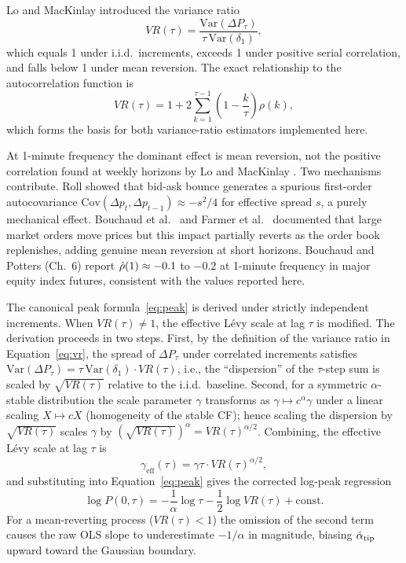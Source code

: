 \documentclass[12pt,a4paper]{article}
\begin{document}
Lo and MacKinlay \cite{LoMacKinlay1988} introduced the variance ratio
\begin{equation}
  VR(\tau) = \frac{\mathrm{Var}(\Delta P_\tau)}{\tau\,\mathrm{Var}(\delta_1)},
  \label{eq:vr}
\end{equation}
which equals 1 under i.i.d.\ increments, exceeds 1 under positive serial
correlation, and falls below 1 under mean reversion. The exact relationship
to the autocorrelation function is
\begin{equation}
  VR(\tau)
  = 1 + 2\sum_{k=1}^{\tau-1}\!\left(1-\frac{k}{\tau}\right)\rho(k),
  \label{eq:vr_rho}
\end{equation}
which forms the basis for both variance-ratio estimators implemented here.

At 1-minute frequency the dominant effect is mean reversion, not the positive
correlation found at weekly horizons by Lo and MacKinlay \cite{LoMacKinlay1988}. Two
mechanisms contribute. Roll \cite{Roll1984} showed that bid-ask bounce
generates a spurious first-order autocovariance $\mathrm{Cov}(\Delta p_t,\Delta p_{t-1})\approx -s^2/4$ for effective spread $s$, a purely mechanical effect. Bouchaud et al.\ \cite{Bouchaud2004} and
Farmer et al.\ \cite{Farmer2006} documented that large market orders move prices but
this impact partially reverts as the order book replenishes, adding genuine
mean reversion at short horizons. Bouchaud and Potters \cite{BouchaudPotters2003} (Ch.~6)
report $\hat{\rho}(1)\approx -0.1$ to $-0.2$ at 1-minute frequency in major
equity index futures, consistent with the values reported here.

The canonical peak formula~\eqref{eq:peak} is derived under strictly
independent increments. When $VR(\tau)\neq 1$, the effective Lévy scale at
lag $\tau$ is modified. The derivation proceeds in two steps.
First, by the definition of the variance ratio in Equation~\eqref{eq:vr},
the spread of $\Delta P_\tau$ under correlated increments satisfies
$\mathrm{Var}(\Delta P_\tau)=\tau\,\mathrm{Var}(\delta_1)\cdot VR(\tau)$,
i.e., the ``dispersion'' of the $\tau$-step sum is scaled by $\sqrt{VR(\tau)}$
relative to the i.i.d.\ baseline.
Second, for a symmetric $\alpha$-stable distribution the scale parameter
$\gamma$ transforms as $\gamma\mapsto c^\alpha\gamma$ under a linear scaling
$X\mapsto cX$ (homogeneity of the stable CF); hence scaling the dispersion
by $\sqrt{VR(\tau)}$ scales $\gamma$ by $(\sqrt{VR(\tau)})^\alpha
= VR(\tau)^{\alpha/2}$.
Combining, the effective Lévy scale at lag $\tau$ is
\begin{equation}
  \gamma_{\mathrm{eff}}(\tau) = \gamma\tau\cdot VR(\tau)^{\alpha/2},
  \label{eq:gamma_eff}
\end{equation}
and substituting into Equation~\eqref{eq:peak} gives the corrected
log-peak regression
\begin{equation}
  \log P(0,\tau)
  = -\frac{1}{\alpha}\log\tau
    - \frac{1}{2}\log VR(\tau)
    + \mathrm{const}.
  \label{eq:corrected_peak}
\end{equation}
For a mean-reverting process ($VR(\tau)<1$) the omission of the second term
causes the raw OLS slope to underestimate $-1/\alpha$ in magnitude, biasing
$\hat{\alpha}_{\mathrm{tip}}$ upward toward the Gaussian boundary.
\end{document}
